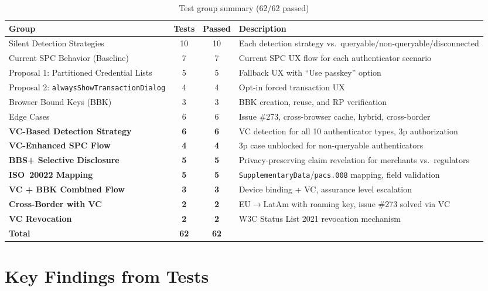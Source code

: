 \documentclass[12pt,a4paper]{article}
\begin{document}
\begin{table}[h]
\centering
\caption{Test group summary (62/62 passed)}
\label{tab:tests}
\begin{tabularx}{\textwidth}{lccl}
\toprule
\textbf{Group} & \textbf{Tests} & \textbf{Passed} & \textbf{Description} \\
\midrule
Silent Detection Strategies & 10 & 10 & Each detection strategy vs.\ queryable/non-queryable/disconnected \\
Current SPC Behavior (Baseline) & 7 & 7 & Current SPC UX flow for each authenticator scenario \\
Proposal 1: Partitioned Credential Lists & 5 & 5 & Fallback UX with ``Use passkey'' option \\
Proposal 2: \texttt{alwaysShowTransactionDialog} & 4 & 4 & Opt-in forced transaction UX \\
Browser Bound Keys (BBK) & 3 & 3 & BBK creation, reuse, and RP verification \\
Edge Cases & 6 & 6 & Issue \#273, cross-browser cache, hybrid, cross-border \\
\textbf{VC-Based Detection Strategy} & \textbf{6} & \textbf{6} & VC detection for all 10 authenticator types, 3p authorization \\
\textbf{VC-Enhanced SPC Flow} & \textbf{4} & \textbf{4} & 3p case unblocked for non-queryable authenticators \\
\textbf{BBS+ Selective Disclosure} & \textbf{5} & \textbf{5} & Privacy-preserving claim revelation for merchants vs.\ regulators \\
\textbf{ISO~20022 Mapping} & \textbf{5} & \textbf{5} & \texttt{SupplementaryData}/\texttt{pacs.008} mapping, field validation \\
\textbf{VC + BBK Combined Flow} & \textbf{3} & \textbf{3} & Device binding + VC, assurance level escalation \\
\textbf{Cross-Border with VC} & \textbf{2} & \textbf{2} & EU$\to$LatAm with roaming key, issue \#273 solved via VC \\
\textbf{VC Revocation} & \textbf{2} & \textbf{2} & W3C Status List 2021 revocation mechanism \\
\midrule
\textbf{Total} & \textbf{62} & \textbf{62} & \\
\bottomrule
\end{tabularx}
\end{table}

\newpage
\section{Key Findings from Tests}
\end{document}
